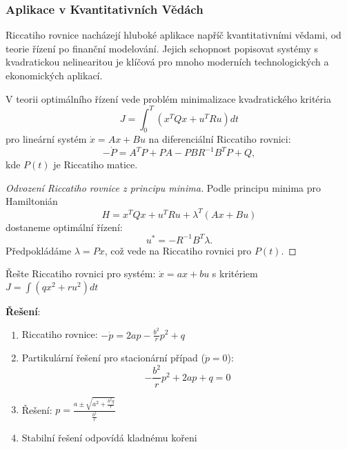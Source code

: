 \subsubsection{Aplikace v Kvantitativních Vědách}
\label{subsubsec:aplikace-kvantitativni-riccati}

Riccatiho rovnice nacházejí hluboké aplikace napříč kvantitativními vědami, od teorie řízení po finanční modelování. Jejich schopnost popisovat systémy s kvadratickou nelinearitou je klíčová pro mnoho moderních technologických a ekonomických aplikací.

\vspace{0.8\baselineskip}

\begin{application}
\label{app:lqr-riccati}
V teorii optimálního řízení vede problém minimalizace kvadratického kritéria
\[
J = \int_{0}^{T} (x^T Q x + u^T R u) dt
\]
pro lineární systém $\dot{x} = A x + B u$ na diferenciální Riccatiho rovnici:
\[
-\dot{P} = A^T P + P A - P B R^{-1} B^T P + Q,
\]
kde $P(t)$ je Riccatiho matice.
\end{application}

\vspace{0.6\baselineskip}

\begin{proof}[Odvození Riccatiho rovnice z principu minima]
Podle principu minima pro Hamiltonián
\[
H = x^T Q x + u^T R u + \lambda^T (A x + B u)
\]
dostaneme optimální řízení:
\[
u^* = -R^{-1} B^T \lambda.
\]
Předpokládáme $\lambda = P x$, což vede na Riccatiho rovnici pro $P(t)$.
\end{proof}

\vspace{0.6\baselineskip}

\begin{example}
\label{ex:lqr-jednorozmerny}
Řešte Riccatiho rovnici pro systém: $\dot{x} = a x + b u$ s kritériem $J = \int (q x^2 + r u^2) dt$

\textbf{Řešení}:
\begin{enumerate}
\item Riccatiho rovnice: $-\dot{p} = 2a p - \frac{b^2}{r} p^2 + q$
\item Partikulární řešení pro stacionární případ ($\dot{p} = 0$):
\[
-\frac{b^2}{r} p^2 + 2a p + q = 0
\]
\item Řešení: $p = \frac{a \pm \sqrt{a^2 + \frac{b^2 q}{r}}}{\frac{b^2}{r}}$
\item Stabilní řešení odpovídá kladnému kořeni
\end{enumerate}
\end{example}

